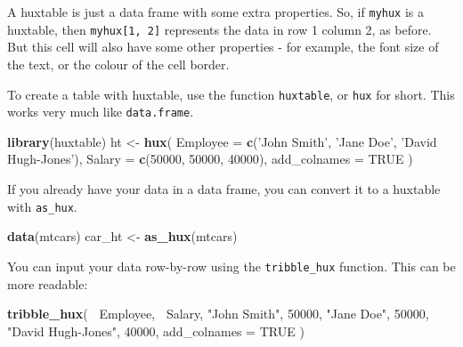 \documentclass[]{article}
\newenvironment{Shaded}{\begin{snugshade}}{\end{snugshade}}
\newcommand{\KeywordTok}[1]{\textcolor[rgb]{0.13,0.29,0.53}{\textbf{#1}}}
\newcommand{\DataTypeTok}[1]{\textcolor[rgb]{0.13,0.29,0.53}{#1}}
\newcommand{\DecValTok}[1]{\textcolor[rgb]{0.00,0.00,0.81}{#1}}
\newcommand{\StringTok}[1]{\textcolor[rgb]{0.31,0.60,0.02}{#1}}
\newcommand{\OtherTok}[1]{\textcolor[rgb]{0.56,0.35,0.01}{#1}}
\newcommand{\OperatorTok}[1]{\textcolor[rgb]{0.81,0.36,0.00}{\textbf{#1}}}
\newcommand{\NormalTok}[1]{#1}
\begin{document}
A huxtable is just a data frame with some extra properties. So, if
\texttt{myhux} is a huxtable, then \texttt{myhux{[}1,\ 2{]}} represents
the data in row 1 column 2, as before. But this cell will also have some
other properties - for example, the font size of the text, or the colour
of the cell border.

To create a table with huxtable, use the function \texttt{huxtable}, or
\texttt{hux} for short. This works very much like \texttt{data.frame}.

\begin{Shaded}
\begin{Highlighting}[]
\KeywordTok{library}\NormalTok{(huxtable)}
\NormalTok{ht <-}\StringTok{ }\KeywordTok{hux}\NormalTok{(}
        \DataTypeTok{Employee     =} \KeywordTok{c}\NormalTok{(}\StringTok{'John Smith'}\NormalTok{, }\StringTok{'Jane Doe'}\NormalTok{, }\StringTok{'David Hugh-Jones'}\NormalTok{), }
        \DataTypeTok{Salary       =} \KeywordTok{c}\NormalTok{(}\DecValTok{50000}\NormalTok{, }\DecValTok{50000}\NormalTok{, }\DecValTok{40000}\NormalTok{),}
        \DataTypeTok{add_colnames =} \OtherTok{TRUE}
\NormalTok{      )}
\end{Highlighting}
\end{Shaded}

\FloatBarrier

If you already have your data in a data frame, you can convert it to a
huxtable with \texttt{as\_hux}.

\begin{Shaded}
\begin{Highlighting}[]
\KeywordTok{data}\NormalTok{(mtcars)}
\NormalTok{car_ht <-}\StringTok{ }\KeywordTok{as_hux}\NormalTok{(mtcars)}
\end{Highlighting}
\end{Shaded}

\FloatBarrier

You can input your data row-by-row using the \texttt{tribble\_hux}
function. This can be more readable:

\begin{Shaded}
\begin{Highlighting}[]
\KeywordTok{tribble_hux}\NormalTok{(}
  \OperatorTok{~}\NormalTok{Employee,          }\OperatorTok{~}\NormalTok{Salary,}
  \StringTok{"John Smith"}\NormalTok{,       }\DecValTok{50000}\NormalTok{,}
  \StringTok{"Jane Doe"}\NormalTok{,         }\DecValTok{50000}\NormalTok{,}
  \StringTok{"David Hugh-Jones"}\NormalTok{, }\DecValTok{40000}\NormalTok{,}
  \DataTypeTok{add_colnames =} \OtherTok{TRUE}
\NormalTok{)}
\end{Highlighting}
\end{Shaded}
\end{document}
